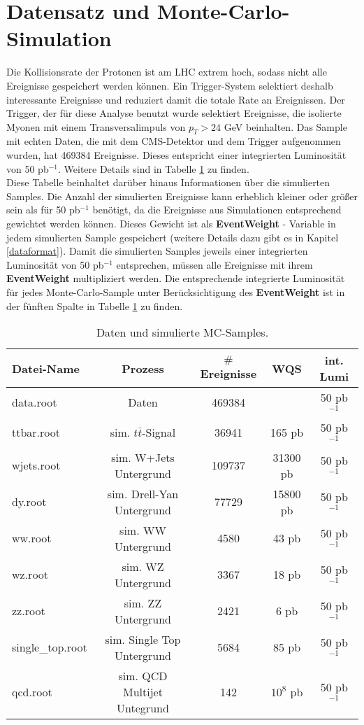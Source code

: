 \section{Datensatz und Monte-Carlo-Simulation}
\label{datasets}
Die Kollisionsrate der Protonen ist am LHC extrem hoch, sodass nicht alle Ereignisse gespeichert werden k\"onnen. Ein Trigger-System selektiert deshalb interessante Ereignisse und reduziert damit die totale Rate an Ereignissen. Der Trigger, der f\"ur diese Analyse benutzt wurde selektiert Ereignisse, die isolierte Myonen mit einem Transversalimpuls von $p_{T}>24$ GeV beinhalten. Das Sample mit echten Daten, die mit dem CMS-Detektor und dem Trigger aufgenommen wurden, hat 469384 Ereignisse. Dieses entspricht einer integrierten Luminosit\"at von 50 pb$^{-1}$. Weitere Details sind in Tabelle \ref{table_samples} zu finden.\\
Diese Tabelle beinhaltet dar\"uber hinaus Informationen \"uber die simulierten Samples. Die Anzahl der simulierten Ereignisse kann erheblich kleiner oder gr\"o\ss{}er sein als f\"ur 50 pb$^{-1}$ ben\"otigt, da die Ereignisse aus Simulationen entsprechend gewichtet werden k\"onnen. Dieses Gewicht ist als \textbf{EventWeight} - Variable in jedem simulierten Sample gespeichert (weitere Details dazu gibt es in Kapitel \ref{dataformat}). Damit die simulierten Samples jeweils einer integrierten Luminosit\"at von 50 pb$^{-1}$ entsprechen, m\"ussen alle Ereignisse mit ihrem \textbf{EventWeight} multipliziert werden. Die entsprechende integrierte Luminosit\"at f\"ur jedes Monte-Carlo-Sample unter Ber\"ucksichtigung des \textbf{EventWeight} ist in der f\"unften Spalte in Tabelle \ref{table_samples} zu finden. 
\begin{small}
\begin{table}[h!]
  \centering
  \begin{tabular}{|l|c|c|c|c|}
    \hline 
Datei-Name & Prozess & $\#$Ereignisse & WQS & int. Lumi \\ \hline\hline
data.root & Daten & 469384 & & 50 pb$^{-1}$ \\ \hline
ttbar.root & sim. $t\bar{t}$-Signal & 36941 & 165 pb & 50 pb$^{-1}$ \\
wjets.root & sim. W+Jets Untergrund & 109737 & 31300 pb & 50 pb$^{-1}$ \\
dy.root & sim. Drell-Yan Untergrund & 77729 & 15800 pb & 50 pb$^{-1}$ \\
ww.root & sim. WW Untergrund & 4580 & 43 pb & 50 pb$^{-1}$ \\
wz.root & sim. WZ Untergrund & 3367 & 18 pb & 50 pb$^{-1}$ \\
zz.root & sim. ZZ Untergrund & 2421 & 6 pb & 50 pb$^{-1}$ \\
single\_top.root & sim. Single Top Untergrund & 5684 & 85 pb & 50 pb$^{-1}$ \\
qcd.root & sim. QCD Multijet Untegrund & 142 & $10^8$ pb & 50 pb$^{-1}$ \\
    \hline
  \end{tabular}
  \caption{Daten und simulierte MC-Samples.}
  \label{table_samples}
\end{table}
\end{small}
